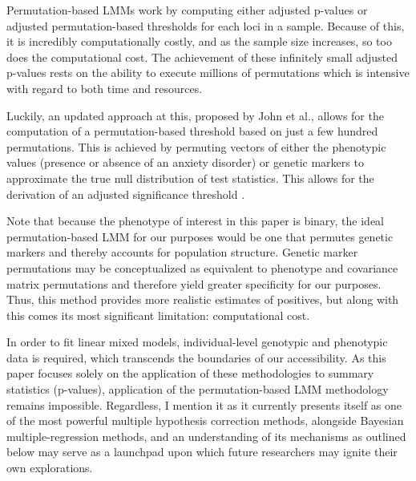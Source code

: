 \documentclass[12pt]{article}
\begin{document}
Permutation-based LMMs work by computing either adjusted p-values or adjusted permutation-based thresholds for each loci in a sample. Because of this, it is incredibly computationally costly, and as the sample size increases, so too does the computational cost. The achievement of these infinitely small adjusted p-values rests on the ability to execute millions of permutations which is intensive with regard to both time and resources. \par

Luckily, an updated approach at this, proposed by John et al., allows for the computation of a permutation-based threshold based on just a few hundred permutations. This is achieved by permuting vectors of either the phenotypic values (presence or absence of an anxiety disorder) or genetic markers to approximate the true null distribution of test statistics. This allows for the derivation of an adjusted significance threshold \cite{Jiang2024}. \par

Note that because the phenotype of interest in this paper is binary, the ideal permutation-based LMM for our purposes would be one that permutes genetic markers and thereby accounts for population structure. Genetic marker permutations may be conceptualized as equivalent to phenotype and covariance matrix permutations and therefore yield greater specificity for our purposes. Thus, this method provides more realistic estimates of positives, but along with this comes its most significant limitation: computational cost. \par

In order to fit linear mixed models, individual-level genotypic and phenotypic data is required, which transcends the boundaries of our accessibility. As this paper focuses solely on the application of these methodologies to summary statistics (p-values), application of the permutation-based LMM methodology remains impossible. Regardless, I mention it as it currently presents itself as one of the most powerful multiple hypothesis correction methods, alongside Bayesian multiple-regression methods, and an understanding of its mechanisms as outlined below may serve as a launchpad upon which future researchers may ignite their own explorations.
\end{document}
